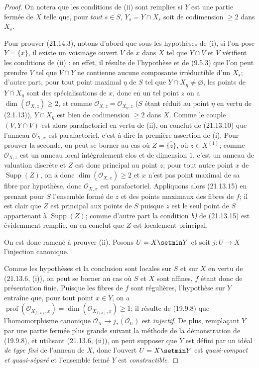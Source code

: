 \begin{proof}
On notera que les conditions de (ii) sont remplies si $Y$ est une partie fermée de $X$
telle que, pour \emph{tout} $s\in S$, $Y_s=Y\cap X_s$ soit de codimension $\geq2$ dans
$X_s$.

Pour prouver (21.14.3), notons d'abord que sous les hypothèses de (i), si l'on
pose $Y=\overline{\{x\}}$, il existe un voisinage ouvert $V$ de $x$ dans $X$ tel que
$Y\cap V$ et $V$ vérifient les conditions de (ii) : en effet, il résulte de l'hypothèse
et de (9.5.3) que l'on peut prendre $V$ tel que $V\cap Y$ ne contienne aucune
composante irréductible d'un $X_s$; d'autre part, pour tout point maximal $\eta$ de
$S$ tel que $Y\cap X_\eta\neq\varnothing$, les points de $Y\cap X_\eta$ sont des
spécialisations de $x$, donc en un tel point $z$ on a
$\dim(\mathcal O_{X,z})\geq2$, et comme
$\mathcal O_{X,z}=\mathcal O_{X_\eta,z}$ ($S$ étant réduit au point $\eta$ en vertu
de (2.1.13)), $Y\cap X_\eta$ est bien de codimension $\geq2$ dans $X$. Comme le
couple $(V,Y\cap V)$ est alors parafactoriel en vertu de (ii), on conclut de (21.13.10)
que l'anneau $\mathcal O_{X,x}$ est parafactoriel, c'est-à-dire la première assertion
de (i). Pour prouver la seconde, on peut se borner au cas où
$Z=\overline{\{z\}}$, où $z\in X^{(1)}$; comme $\mathcal O_{X,z}$ est un anneau local
intégralement clos et de dimension $1$, c'est un anneau de valuation discrète et $Z$
est donc principal au point $z$; pour tout autre point $x$ de
$\operatorname{Supp}(Z)$, on a donc $\dim(\mathcal O_{X,x})\geq2$ et $x$ n'est pas
point maximal de sa fibre par hypothèse, donc $\mathcal O_{X,x}$ est parafactoriel.
Appliquons alors (21.13.15) en prenant pour $S$ l'ensemble formé de $z$ et des points
maximaux des fibres de $f$; il est clair que $Z$ est principal aux points de $S$
puisque $z$ est le seul point de $S$ appartenant à $\operatorname{Supp}(Z)$; comme
d'autre part la condition \emph{b)} de (21.13.15) est évidemment remplie, on en conclut que
$Z$ est localement principal.

On est donc ramené à prouver (ii). Posons $U=X\setmin Y$ et soit $j:U\to X$ l'injection
canonique.

Comme les hypothèses et la conclusion sont locales sur $S$ et sur $X$ en vertu de
(21.13.6, (i)), on peut se borner au cas où $S$ et $X$ sont affines, $f$ étant donc de
présentation finie. Puisque les fibres de $f$ sont régulières, l'hypothèse sur $Y$
entraîne que, pour tout point $x\in Y$, on a $\operatorname{prof}(\mathcal O_{X_{f(x)},x})=\dim(\mathcal O_{X_{f(x)},x})\geq1$;
il résulte de (19.9.8) que l'homomorphisme canonique
$\mathcal O_X\to j_*(\mathcal O_U)$ est \emph{injectif}. De plus, remplaçant $Y$ par
une partie fermée plus grande suivant la méthode de la démonstration de (19.9.8), et
utilisant (21.13.6, (ii)), on peut supposer que $Y$ est défini par un idéal \emph{de
type fini} de l'anneau de $X$, donc l'ouvert $U=X\setmin Y$ est \emph{quasi-compact et
quasi-séparé} et l'ensemble fermé $Y$ est \emph{constructible}.


\end{proof}
